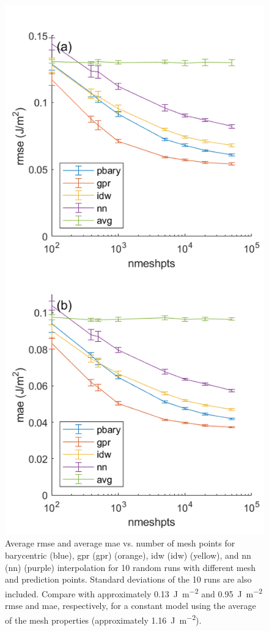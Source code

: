 \documentclass[preprint,12pt]{elsarticle}
\begin{document}
\begin{figure}
    \centering
    \includegraphics{brkerror.png}
    \caption{Average \acrlong{rmse} and average \acrlong{mae} vs. number of mesh points for barycentric (blue), \acrlong{gpr} (\acrshort{gpr}) (orange), \acrlong{idw} (\acrshort{idw}) (yellow), and \acrlong{nn} (\acrshort{nn}) (purple) interpolation for 10 random runs with different mesh and prediction points. Standard deviations of the 10 runs are also included. Compare with approximately \SI{0.13}{\J\per\square\meter} and \SI{0.95}{\J\per\square\meter} \acrshort{rmse} and \acrshort{mae}, respectively, for a constant model using the average of the mesh properties (approximately \SI{1.16}{\J\per\square\meter}).}
    \label{fig:brkerror}
\end{figure}
    
\end{document}
